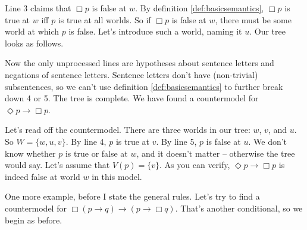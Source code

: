 \begin{center}
\end{center}

Line 3 claims that $\Box p$ is false at $w$. By definition
\ref{def:basicsemantics}, $\Box p$ is true at $w$ iff $p$ is true at all worlds.
So if $\Box p$ is false at $w$, there must be some world at which $p$ is false.
Let's introduce such a world, naming it $u$. Our tree looks as follows.

\begin{center}
\end{center}

Now the only unprocessed lines are hypotheses about sentence letters and
negations of sentence letters. Sentence letters don't have (non-trivial)
subsentences, so we can't use definition \ref{def:basicsemantics} to further
break down 4 or 5. The tree is complete. We have found a countermodel for
$\Diamond p \to \Box p$.

Let's read off the countermodel. There are three worlds in our tree: $w$, $v$,
and $u$. So $W = \{ w, u, v \}$. By line 4, $p$ is true at $v$. By line 5, $p$
is false at $u$. We don't know whether $p$ is true or false at $w$, and it
doesn't matter -- otherwise the tree would say. Let's assume that
$V(p) = \{ v \}$. As you can verify, $\Diamond p\to \Box p$ is indeed false at
world $w$ in this model.

One more example, before I state the general rules. Let's try to find a
countermodel for $\Box(p\to q) \to (p \to \Box q)$. That's another conditional,
so we begin as before.
\begin{center}
\end{center}

